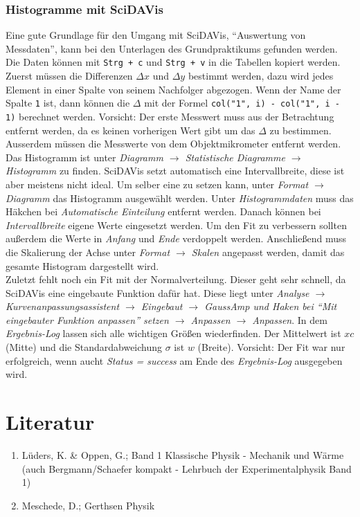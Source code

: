 \subsubsection*{Histogramme mit SciDAVis}
Eine gute Grundlage für den Umgang mit SciDAVis, ``Auswertung von Messdaten'', kann bei den Unterlagen des Grundpraktikums gefunden werden.\\
Die Daten können mit \verb|Strg + c| und \verb|Strg + v|  in die Tabellen kopiert werden. Zuerst müssen die Differenzen $\Delta x$ und $\Delta y$ bestimmt werden, dazu wird jedes Element in einer Spalte von seinem Nachfolger abgezogen. Wenn der Name der Spalte \verb|1|  ist, dann können die $\Delta$ mit der Formel \verb|col("1", i) - col("1", i - 1)| berechnet werden. Vorsicht: Der erste Messwert muss aus der Betrachtung entfernt werden, da es keinen vorherigen Wert gibt um das $\Delta$ zu bestimmen. Ausserdem müssen die Messwerte von dem Objektmikrometer entfernt werden.\\
Das Histogramm ist unter \emph{Diagramm $\rightarrow$ Statistische Diagramme $\rightarrow$ Histogramm} zu finden. SciDAVis setzt automatisch eine Intervallbreite, diese ist aber meistens nicht ideal. Um selber eine zu setzen kann, unter \emph{Format $\rightarrow$ Diagramm} das Histogramm ausgewählt werden. Unter \emph{Histogrammdaten} muss das Häkchen bei \emph{Automatische Einteilung} entfernt werden. Danach können bei \emph{Intervallbreite} eigene Werte eingesetzt werden. Um den Fit zu verbessern sollten außerdem die Werte in \emph{Anfang} und \emph{Ende} verdoppelt werden. Anschließend muss die Skalierung der Achse unter \emph{Format $\rightarrow$ Skalen} angepasst werden, damit das gesamte Histogram dargestellt wird. \\
Zuletzt fehlt noch ein Fit mit der Normalverteilung. Dieser geht sehr schnell, da SciDAVis eine eingebaute Funktion dafür hat. Diese liegt unter \emph{Analyse $\rightarrow$ Kurvenanpassungsassistent $\rightarrow$ Eingebaut $\rightarrow$ GaussAmp und Haken bei ``Mit eingebauter Funktion anpassen'' setzen $\rightarrow$ Anpassen $\rightarrow$ Anpassen}. In dem \emph{Ergebnis-Log} lassen sich alle wichtigen Größen wiederfinden. Der Mittelwert ist $xc$ (Mitte) und die Standardabweichung $\sigma$ ist $w$ (Breite). Vorsicht: Der Fit war nur erfolgreich, wenn aucht \emph{Status = success} am Ende des \emph{Ergebnis-Log} ausgegeben wird.


\section*{Literatur}

\begin{enumerate}

  \item Lüders, K. \& Oppen, G.; Band 1 Klassische Physik - Mechanik und Wärme\\ (auch Bergmann/Schaefer kompakt - Lehrbuch der Experimentalphysik Band 1) \label{it:bergmann}

  \item Meschede, D.; Gerthsen Physik

\end{enumerate}
